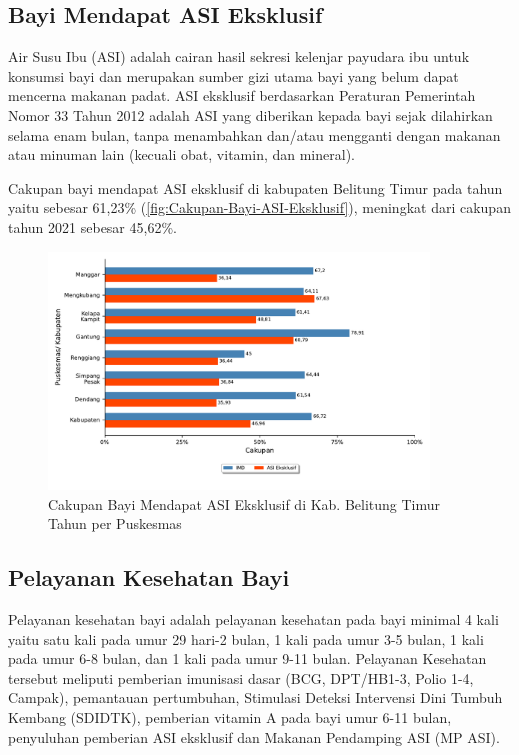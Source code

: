 \subsection{Bayi Mendapat ASI Eksklusif}
Air Susu Ibu (ASI) adalah cairan hasil sekresi kelenjar payudara ibu
untuk konsumsi bayi dan merupakan sumber gizi utama bayi yang belum
dapat mencerna makanan padat. ASI eksklusif berdasarkan Peraturan
Pemerintah Nomor 33 Tahun 2012 adalah ASI yang diberikan kepada bayi
sejak dilahirkan selama enam bulan, tanpa menambahkan dan/atau mengganti
dengan makanan atau minuman lain (kecuali obat, vitamin, dan mineral).

Cakupan bayi mendapat ASI eksklusif di kabupaten Belitung Timur pada
tahun \tP yaitu sebesar 61,23\% (\autoref{fig:Cakupan-Bayi-ASI-Eksklusif}), meningkat dari cakupan tahun 2021 sebesar 45,62\%.

\begin{figure}[H]
  \centering
  \includegraphics[width=0.9\textwidth]{bab_05/bab_05_15_ASIeksklusif}
  \caption{Cakupan Bayi Mendapat ASI Eksklusif di Kab. Belitung Timur Tahun \tP per Puskesmas}
  \label{fig:Cakupan-Bayi-ASI-Eksklusif}
\end{figure}

\subsection{Pelayanan Kesehatan Bayi}
Pelayanan kesehatan bayi adalah pelayanan kesehatan pada bayi minimal
4 kali yaitu satu kali pada umur 29 hari-2 bulan, 1 kali pada umur
3-5 bulan, 1 kali pada umur 6-8 bulan, dan 1 kali pada umur 9-11 bulan.
Pelayanan Kesehatan tersebut meliputi pemberian imunisasi dasar (BCG,
DPT/HB1-3, Polio 1-4, Campak), pemantauan pertumbuhan, Stimulasi Deteksi
Intervensi Dini Tumbuh Kembang (SDIDTK), pemberian vitamin A pada
bayi umur 6-11 bulan, penyuluhan pemberian ASI eksklusif dan Makanan
Pendamping ASI (MP ASI).

